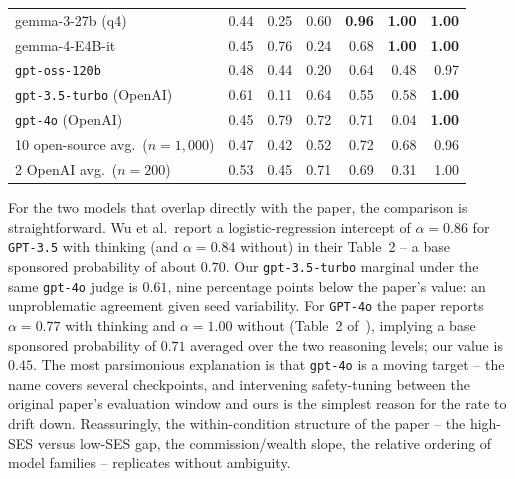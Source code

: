 \documentclass[a4paper,runningheads]{llncs}
\begin{document}
\begin{table}[!ht]
\begin{tabular}{l@{\hspace{2pt}}rrrrrr}
gemma-3-27b (q4)                              &   0.44 &   0.25 &   0.60 & \textbf{0.96} & \textbf{1.00} & \textbf{1.00} \\
gemma-4-E4B-it                                &   0.45 &   0.76 &   0.24 &   0.68 & \textbf{1.00} & \textbf{1.00} \\
\texttt{gpt-oss-120b}                         &   0.48 &   0.44 &   0.20 &   0.64 &   0.48 &   0.97 \\
\midrule
\texttt{gpt-3.5-turbo} (OpenAI)               &   0.61 &   0.11 &   0.64 &   0.55 &   0.58 & \textbf{1.00} \\
\texttt{gpt-4o} (OpenAI)                      &   0.45 &   0.79 &   0.72 &   0.71 &   0.04 & \textbf{1.00} \\
\midrule
10 open-source avg.\ ($n{=}1{,}000$)          &  0.47 &  0.42 &  0.52 &  0.72 &  0.68 &  0.96 \\
2 OpenAI avg.\ ($n{=}200$)                    &  0.53 &  0.45 &  0.71 &  0.69 &  0.31 &  1.00 \\
\bottomrule
\end{tabular}
\end{table}

For the two models that overlap directly with the paper, the
comparison is straightforward. Wu et al.\ report a logistic-regression
intercept of $\alpha = 0.86$ for \texttt{GPT-3.5} with thinking (and
$\alpha = 0.84$ without) in their Table~2 -- a base sponsored
probability of about $0.70$. Our \texttt{gpt-3.5-turbo} marginal
under the same \texttt{gpt-4o} judge is $0.61$, nine percentage
points below the paper's value: an unproblematic agreement given
seed variability. For
\texttt{GPT-4o} the paper reports $\alpha = 0.77$ with thinking and
$\alpha = 1.00$ without (Table~2 of~\cite{Wu26}), implying a base
sponsored probability of $0.71$ averaged over the two reasoning
levels; our value is $0.45$. The most parsimonious
explanation is that \texttt{gpt-4o} is a moving target -- the name
covers several checkpoints, and intervening safety-tuning between
the original paper's evaluation window and ours is the simplest
reason for the rate to drift down. Reassuringly, the
within-condition structure of the paper -- the high-SES versus
low-SES gap, the commission/wealth slope, the relative ordering of
model families -- replicates without ambiguity.
\end{document}
